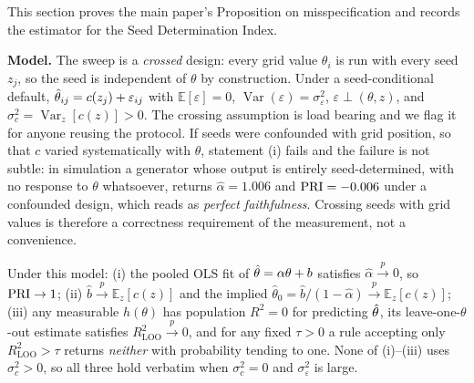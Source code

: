 \documentclass[10pt,twocolumn,letterpaper]{article}
\begin{document}
This section proves the main paper's Proposition on misspecification and
records the estimator for the Seed Determination Index.

\textbf{Model.} The sweep is a \emph{crossed} design: every grid value
$\theta_i$ is run with every seed $z_j$, so the seed is independent of
$\theta$ by construction. Under a seed-conditional default,
$\hat{\theta}_{ij}=c(z_j)+\varepsilon_{ij}$ with $\mathbb{E}[\varepsilon]=0$,
$\operatorname{Var}(\varepsilon)=\sigma_\varepsilon^2$,
$\varepsilon\perp(\theta,z)$, and
$\sigma_c^2=\operatorname{Var}_z[c(z)]>0$. The crossing assumption is load
bearing and we flag it for anyone reusing the protocol. If seeds were
confounded with grid position, so that $c$ varied systematically with
$\theta$, statement (i) fails and the failure is not subtle: in simulation a
generator whose output is entirely seed-determined, with no response to
$\theta$ whatsoever, returns $\hat\alpha=1.006$ and $\mathrm{PRI}=-0.006$ under a
confounded design, which reads as \emph{perfect faithfulness}. Crossing seeds
with grid values is therefore a correctness requirement of the measurement,
not a convenience.

\begin{propositionstar}
Under this model: (i) the pooled OLS fit of $\hat{\theta}=\alpha\theta+b$
satisfies $\hat\alpha\xrightarrow{p}0$, so $\mathrm{PRI}\to1$; (ii)
$\hat b\xrightarrow{p}\mathbb{E}_z[c(z)]$ and the implied
$\hat\theta_0=\hat b/(1-\hat\alpha)\xrightarrow{p}\mathbb{E}_z[c(z)]$; (iii)
any measurable $h(\theta)$ has population $R^2=0$ for predicting $\hat{\theta}$,
its leave-one-$\theta$-out estimate satisfies
$R^2_{\mathrm{LOO}}\xrightarrow{p}0$, and for any fixed $\tau>0$ a rule
accepting only $R^2_{\mathrm{LOO}}>\tau$ returns \emph{neither} with
probability tending to one. None of (i)--(iii) uses $\sigma_c^2>0$, so all
three hold verbatim when $\sigma_c^2=0$ and $\sigma_\varepsilon^2$ is large.
\end{propositionstar}
\end{document}
